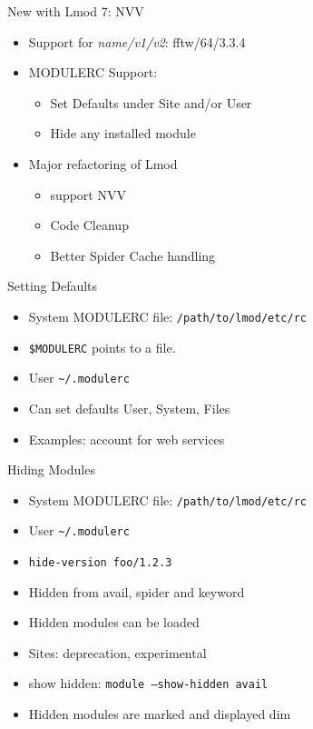 \documentclass{beamer}
\begin{document}
\begin{frame}{New with Lmod 7: NVV}
  \begin{itemize}
    \item Support for \emph{name/v1/v2}:  fftw/64/3.3.4
    \item MODULERC Support:
      \begin{itemize}
        \item Set Defaults under Site and/or User
        \item Hide any installed module
      \end{itemize}
    \item Major refactoring of Lmod 
      \begin{itemize}
        \item support NVV
        \item Code Cleanup
        \item Better Spider Cache handling
      \end{itemize}
  \end{itemize}
\end{frame}

\begin{frame}{Setting Defaults}
  \begin{itemize}
    \item System MODULERC file: \texttt{/path/to/lmod/etc/rc}
    \item \texttt{\$MODULERC} points to a file.
    \item User \texttt{\textasciitilde/.modulerc}
    \item Can set defaults User, System, Files
    \item Examples: account for web services
  \end{itemize}
\end{frame}

\begin{frame}{Hiding Modules}
  \begin{itemize}
    \item System MODULERC file: \texttt{/path/to/lmod/etc/rc}
    \item User \texttt{\textasciitilde/.modulerc}
    \item \texttt{\color{blue}hide-version foo/1.2.3}
    \item Hidden from avail, spider and keyword
    \item Hidden modules can be loaded
    \item Sites: deprecation, experimental
    \item show hidden: \texttt{module --show-hidden avail}
    \item Hidden modules are marked and displayed dim
  \end{itemize}
\end{frame}
\end{document}
